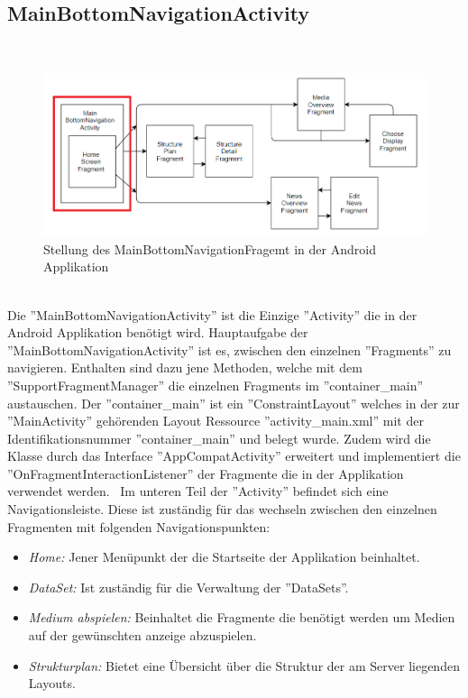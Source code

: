 \subsection{MainBottomNavigationActivity}
\\
\begin{figure}[H]
\centering
\includegraphics[width=1.0\textwidth]{images/06_AndroidApp/06_AndroidArchMainBottomNavigationActivity}
\caption{Stellung des MainBottomNavigationFragemt in der Android Applikation}
\label{fig:mediaNav}
\end{figure}
\\
Die ''MainBottomNavigationActivity'' ist die Einzige ''Activity'' die in der Android Applikation benötigt wird. Hauptaufgabe der ''MainBottomNavigationActivity'' ist es, zwischen den einzelnen ''Fragments'' zu navigieren. Enthalten sind dazu jene Methoden, welche mit dem ''SupportFragmentManager'' die einzelnen Fragments im ''container\_main'' austauschen. Der ''container\_main'' ist ein ''ConstraintLayout'' welches in der zur ''MainActivity'' gehörenden Layout Ressource ''activity\_main.xml'' mit der Identifikationsnummer ''container\_main'' und  belegt wurde. Zudem wird die Klasse durch das Interface ''AppCompatActivity'' erweitert und implementiert die ''OnFragmentInteractionListener'' der Fragmente die in der Applikation verwendet werden. 
\
Im unteren Teil der ''Activity'' befindet sich eine Navigationsleiste. Diese ist zuständig für das wechseln zwischen den einzelnen Fragmenten mit folgenden Navigationspunkten: 

\begin{itemize}
	\item {\em Home:} Jener Menüpunkt der die Startseite der Applikation beinhaltet.
	\item {\em DataSet:} Ist zuständig für die Verwaltung der ''DataSets''.
	\item{\em Medium abspielen:} Beinhaltet die Fragmente die benötigt werden um Medien auf der gewünschten anzeige abzuspielen.
	\item {\em Strukturplan:} Bietet eine Übersicht über die Struktur der am Server liegenden Layouts.
\end{itemize}
